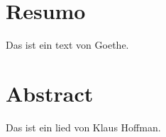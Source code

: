 \chapter*{Resumo}
 Das ist ein text von Goethe. \lipsum[1]

\chapter*{Abstract}
 Das ist ein lied von Klaus Hoffman.\lipsum[5]
